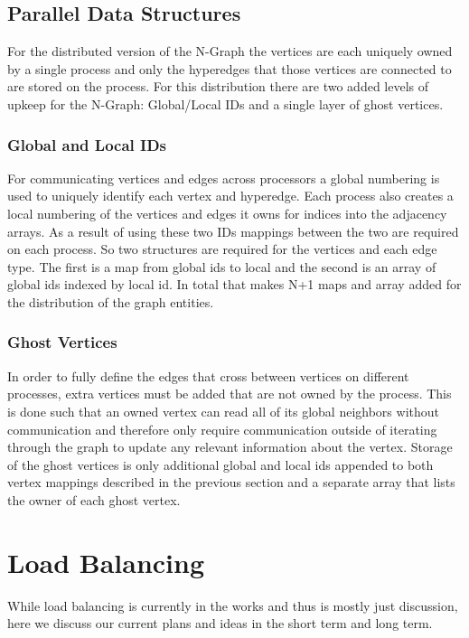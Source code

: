 \documentclass[12pt]{article}
\begin{document}
\subsection{Parallel Data Structures}

For the distributed version of the N-Graph the vertices are each uniquely
owned by a single process and only the hyperedges that those vertices are
connected to are stored on the process. For this distribution there are two
added levels of upkeep for the N-Graph: Global/Local IDs and a single layer
of ghost vertices.

\subsubsection{Global and Local IDs}
For communicating vertices and edges across processors a global numbering
is used to uniquely identify each vertex and hyperedge. Each process also
creates a local numbering of the vertices and edges it owns for indices
into the adjacency arrays. As a result of using these two IDs mappings
between the two are required on each process. So two structures are required
for the vertices and each edge type. The first is a map from global ids to
local and the second is an array of global ids indexed by local id. In total
that makes N+1 maps and array added for the distribution of the graph entities.

\subsubsection{Ghost Vertices}
In order to fully define the edges that cross between vertices on different
processes, extra vertices must be added that are not owned by the process. This
is done such that an owned vertex can read all of its global neighbors without
communication and therefore only require communication outside of iterating
through the graph to update any relevant information about the vertex. Storage
of the ghost vertices is only additional global and local ids appended to both
vertex mappings described in the previous section and a separate array that lists
the owner of each ghost vertex.

\section{Load Balancing}
While load balancing is currently in the works and thus is mostly just
discussion, here we discuss our current plans and ideas in the short term and
long term.
\end{document}
